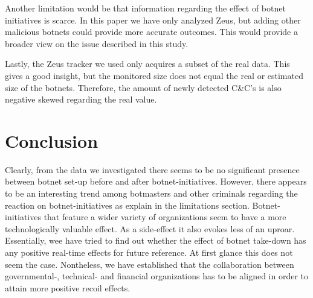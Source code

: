 \documentclass{sig-alternate-br}
\begin{document}
Another limitation would be that information regarding the effect of botnet initiatives is scarce. In this paper we have only analyzed Zeus, but adding other malicious botnets could provide more accurate outcomes. This would provide a broader view on the issue described in this study.

Lastly, the Zeus tracker we used only acquires a subset of the real data. This gives a good insight, but the monitored size does not equal the real or estimated size of the botnets. Therefore, the amount of newly detected C\&C's is also negative skewed regarding the real value. 

\section{Conclusion}
Clearly, from the data we investigated there seems to be no significant presence between botnet set-up before and after botnet-initiatives. However, there appears to be an interesting trend among botmasters and other criminals regarding the reaction on botnet-initiatives as explain in the limitations section. Botnet-initiatives that feature a wider variety of organizations seem to have a more technologically valuable effect. As a side-effect it also evokes less of an uproar.
Essentially, wee have tried to find out whether the effect of botnet take-down has any positive real-time effects for future reference. At first glance this does not seem the case. Nontheless, we have established that the collaboration between governmental-, technical- and financial organizations has to be aligned in order to attain more positive recoil effects.\\ 


\balance


  
\end{document}

